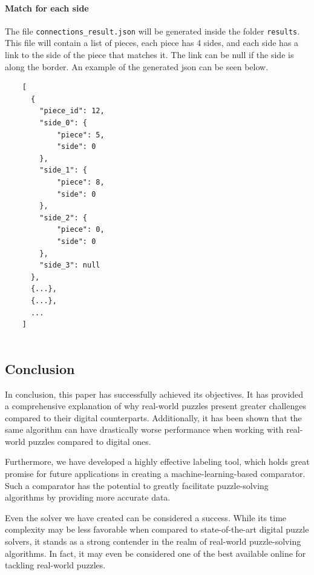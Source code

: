 \documentclass{article}
\begin{document}
\paragraph{Match for each side}
The file \texttt{connections\_result.json} will be generated
inside the folder \texttt{results}. This file will contain a list of pieces,
each piece has 4 sides, and each side has a link to the side of the piece
that matches it. The link can be null if the side is along the border.\newline
An example of the generated json can be seen below.


\begin{minipage}{\textwidth}
  \begin{lstlisting}
    [
      {
        "piece_id": 12,
        "side_0": {
            "piece": 5,
            "side": 0
        },
        "side_1": {
            "piece": 8,
            "side": 0
        },
        "side_2": {
            "piece": 0,
            "side": 0
        },
        "side_3": null
      },
      {...},
      {...},
      ...
    ]
  
  \end{lstlisting}
\end{minipage}

\subsection{Conclusion}

In conclusion, this paper has successfully achieved its objectives.
It has provided a comprehensive explanation of why real-world puzzles
present greater challenges compared to their digital counterparts.
Additionally, it has been shown that the same algorithm can have drastically worse
performance when working with real-world puzzles compared to digital ones.

Furthermore, we have developed a highly effective labeling tool,
which holds great promise for future applications in creating a
machine-learning-based comparator. Such a comparator has the potential
to greatly facilitate puzzle-solving algorithms by providing more
accurate data.

Even the solver we have created can be considered a success.
While its time complexity may be less favorable when compared to state-of-the-art
digital puzzle solvers, it stands as a strong contender in the realm of
real-world puzzle-solving algorithms. In fact, it may even be considered
one of the best available online for tackling real-world puzzles.
\end{document}

